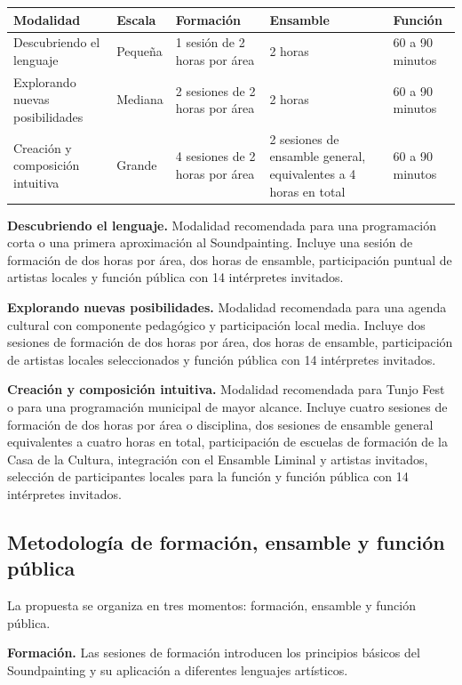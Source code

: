 \documentclass[11pt,a4paper]{article}
\newcommand{\SectionTone}{SectionBlue}
\newcommand{\tableheadcolor}{\rowcolor{\SectionTone!22}}
\begin{document}
{\small
\begin{tabularx}{\textwidth}{@{}L{0.23\textwidth}L{0.13\textwidth}Y Y Y@{}}
\toprule
\tableheadcolor
\textbf{Modalidad} & \textbf{Escala} & \textbf{Formación} & \textbf{Ensamble} & \textbf{Función} \\
\midrule
Descubriendo el lenguaje & Pequeña & 1 sesión de 2 horas por área & 2 horas & 60 a 90 minutos \\
Explorando nuevas posibilidades & Mediana & 2 sesiones de 2 horas por área & 2 horas & 60 a 90 minutos \\
Creación y composición intuitiva & Grande & 4 sesiones de 2 horas por área & 2 sesiones de ensamble general, equivalentes a 4 horas en total & 60 a 90 minutos \\
\bottomrule
\end{tabularx}
}

\textbf{Descubriendo el lenguaje.} Modalidad recomendada para una programación corta o una primera aproximación al Soundpainting. Incluye una sesión de formación de dos horas por área, dos horas de ensamble, participación puntual de artistas locales y función pública con 14 intérpretes invitados.

\textbf{Explorando nuevas posibilidades.} Modalidad recomendada para una agenda cultural con componente pedagógico y participación local media. Incluye dos sesiones de formación de dos horas por área, dos horas de ensamble, participación de artistas locales seleccionados y función pública con 14 intérpretes invitados.

\textbf{Creación y composición intuitiva.} Modalidad recomendada para Tunjo Fest o para una programación municipal de mayor alcance. Incluye cuatro sesiones de formación de dos horas por área o disciplina, dos sesiones de ensamble general equivalentes a cuatro horas en total, participación de escuelas de formación de la Casa de la Cultura, integración con el Ensamble Liminal y artistas invitados, selección de participantes locales para la función y función pública con 14 intérpretes invitados.

\subsection{Metodología de formación, ensamble y función pública}

La propuesta se organiza en tres momentos: formación, ensamble y función pública.

\textbf{Formación.} Las sesiones de formación introducen los principios básicos del Soundpainting y su aplicación a diferentes lenguajes artísticos.
\end{document}
